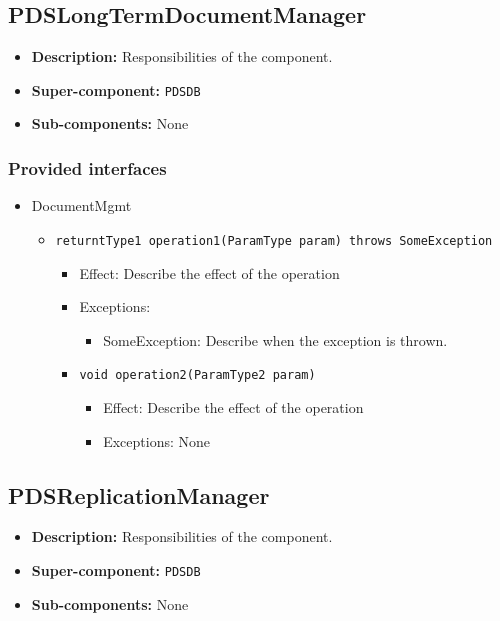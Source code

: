 \documentclass[a4paper,10pt]{article}
\begin{document}
\subsection{PDSLongTermDocumentManager}
\begin{itemize}
    \item \textbf{Description:} Responsibilities of the component.
    \item \textbf{Super-component:} \texttt{PDSDB}
    \item \textbf{Sub-components:} None
\end{itemize}

\subsubsection*{Provided interfaces}
\begin{itemize}
    \item DocumentMgmt
    \begin{itemize}
        \item \texttt{returntType1 operation1(ParamType param) throws SomeException}
        \begin{itemize}
            \item Effect: Describe the effect of the operation
            \item Exceptions:
            \begin{itemize}
                \item SomeException: Describe when the exception is thrown.
            \end{itemize}

            \item \texttt{void operation2(ParamType2 param)}
            \begin{itemize}
                \item Effect: Describe the effect of the operation
                \item Exceptions: None
            \end{itemize}
        \end{itemize}
    \end{itemize}
\end{itemize}



\subsection{PDSReplicationManager}
\begin{itemize}
    \item \textbf{Description:} Responsibilities of the component.
    \item \textbf{Super-component:} \texttt{PDSDB}
    \item \textbf{Sub-components:} None
\end{itemize}
\end{document}
